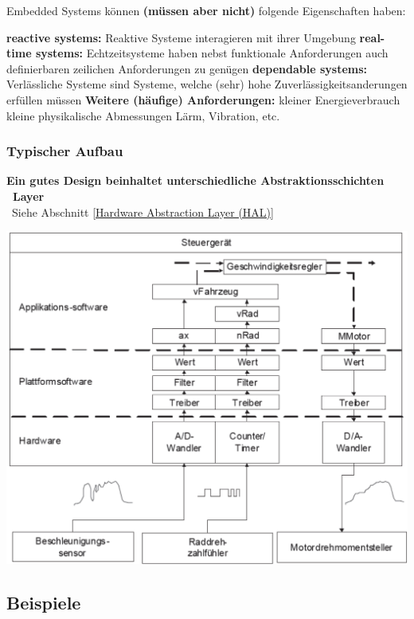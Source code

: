 Embedded Systems können \textbf{(müssen aber nicht)} folgende Eigenschaften haben:

\begin{outline}
    \1 \textbf{reactive systems:}  Reaktive Systeme interagieren mit ihrer Umgebung
    \1 \textbf{real-time systems:} Echtzeitsysteme haben nebst funktionale Anforderungen auch definierbaren zeilichen Anforderungen zu genügen
    \1 \textbf{dependable systems:} Verlässliche Systeme sind Systeme, welche (sehr) hohe Zuverlässigkeitsanderungen erfüllen müssen
    \1 \textbf{Weitere (häufige) Anforderungen:} 
        \2 kleiner Energieverbrauch
        \2 kleine physikalische Abmessungen
        \2 Lärm, Vibration, etc.
\end{outline}


\subsubsection{Typischer Aufbau}

\textbf{Ein gutes Design beinhaltet unterschiedliche Abstraktionsschichten \textrightarrow\ Layer} \\
\textrightarrow\ Siehe Abschnitt \ref{Hardware Abstraction Layer (HAL)}

\begin{center}
    \includegraphics[width=0.8\columnwidth]{images/embedded_system_aufbau_schichten.png}
\end{center}


\subsection{Beispiele}

